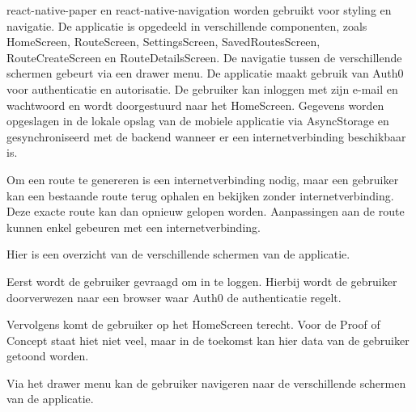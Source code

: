     react-native-paper en react-native-navigation worden gebruikt voor styling en navigatie. 
    De applicatie is opgedeeld in verschillende componenten, 
    zoals HomeScreen, RouteScreen, SettingsScreen, SavedRoutesScreen, RouteCreateScreen en RouteDetailsScreen. 
    De navigatie tussen de verschillende schermen gebeurt via een drawer menu. 
    De applicatie maakt gebruik van Auth0 voor authenticatie en autorisatie. 
    De gebruiker kan inloggen met zijn e-mail en wachtwoord en wordt doorgestuurd naar het HomeScreen. 
    Gegevens worden opgeslagen in de lokale opslag van de mobiele applicatie via AsyncStorage 
    en gesynchroniseerd met de backend wanneer er een internetverbinding beschikbaar is.

    Om een route te genereren is een internetverbinding nodig, 
    maar een gebruiker kan een bestaande route terug ophalen en bekijken zonder internetverbinding. Deze exacte route kan dan opnieuw gelopen worden. Aanpassingen aan de route kunnen enkel gebeuren met een internetverbinding.
    
    Hier is een overzicht van de verschillende schermen van de applicatie.
    
    Eerst wordt de gebruiker gevraagd om in te loggen. Hierbij wordt de gebruiker doorverwezen naar een browser waar Auth0 de authenticatie regelt.


    Vervolgens komt de gebruiker op het HomeScreen terecht. Voor de Proof of Concept staat hiet niet veel, 
    maar in de toekomst kan hier data van de gebruiker getoond worden.


    Via het drawer menu kan de gebruiker navigeren naar de verschillende schermen van de applicatie.


